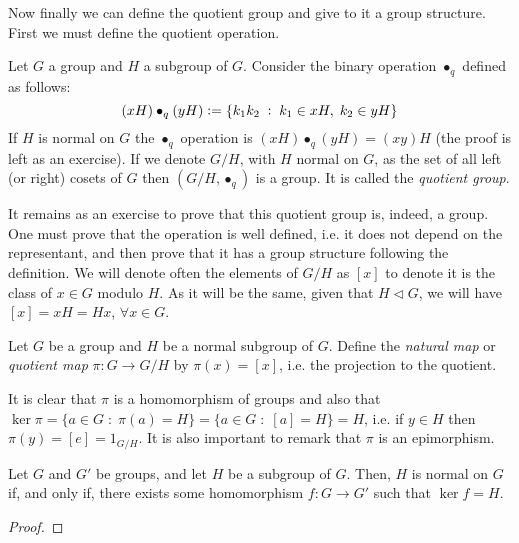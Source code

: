 \documentclass[../main.tex]{subfiles}
\begin{document}
Now finally we can define the quotient group and give to it a group structure. First we must define the quotient operation.

\begin{defi}
Let $G$ a group and $H$ a subgroup of $G$. Consider the binary operation $\bullet_q$ defined as follows:
\begin{equation}
    \notag
    (xH)\bullet_q(yH) :=\{k_1k_2\;:\;k_1\in xH,\;k_2\in yH\}
\end{equation}
If $H$ is normal on $G$ the $\bullet_q$ operation is $(xH)\bullet_q(yH) = (xy)H$ (the proof is left as an exercise). If we denote $G/H$, with $H$ normal on $G$, as the set of all left (or right) cosets of $G$ then $(G/H,\bullet_q)$ is a group. It is called the \textit{quotient group}.
\end{defi}

It remains as an exercise to prove that this quotient group is, indeed, a group. One must prove that the operation is well defined, i.e. it does not depend on the representant, and then prove that it has a group structure following the definition. We will denote often the elements of $G/H$ as $[x]$ to denote it is the class of $x\in G$ modulo $H$. As it will be the same, given that $H\vartriangleleft G$, we will have $[x] = xH = Hx$, $\forall x\in G$.

\begin{defi}
 Let $G$ be a group and $H$ be a normal subgroup of $G$. Define the \textit{natural map} or \textit{quotient map} $\pi:G\rightarrow G/H$ by $\pi(x) = [x]$, i.e. the projection to the quotient.
\end{defi}

\begin{nota}
It is clear that $\pi$ is a homomorphism of groups and also that $\ker\pi = \{a\in G\;:\;\pi(a) = H\} = \{a\in G\;:\;[a] = H\} = H$, i.e. if $y\in H$ then $\pi(y) = [e] = 1_{G/H}$. It is also important to remark that $\pi$ is an epimorphism.
\end{nota}


\begin{ter}
Let $G$ and $G'$ be groups, and let $H$ be a subgroup of $G$. Then, $H$ is normal on $G$ if, and only if, there exists some homomorphism $f:G\rightarrow G'$ such that $\ker f = H$.
\end{ter}
\begin{proof}
\noproof
\end{proof}
\end{document}
